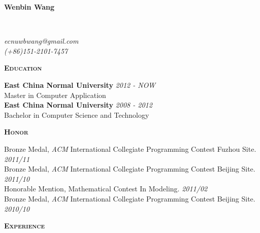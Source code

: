 \documentclass[a4paper]{article}
\newenvironment{changemargin}[2]{%
  \begin{list}{}{%
    \setlength{\topsep}{0pt}%
    \setlength{\leftmargin}{#1}%
    \setlength{\rightmargin}{#2}%
    \setlength{\listparindent}{\parindent}%
    \setlength{\itemindent}{\parindent}%
    \setlength{\parsep}{\parskip}%
  }%
  \item[]}{\end{list}
}
\newcommand{\lineover}{
	\begin{changemargin}{-0.05in}{-0.05in}
		\vspace*{-8pt}
		\hrulefill \\
		\vspace*{-2pt}
	\end{changemargin}
}
\newcommand{\header}[1]{
	\begin{changemargin}{-0.5in}{-0.5in}
		\scshape{\textbf{#1}}\\
	\end{changemargin}
}
\newcommand{\contact}[3]{
	\begin{changemargin}{-0.5in}{-0.5in}
		{\Large \textbf{#1}}\\ \smallskip
		\lineover
		\begin{flushright}
			\emph{#2}\\ \smallskip
			\emph{#3}\smallskip
		\end{flushright}
	\end{changemargin}
}
\newenvironment{body} {
	\vspace*{-16pt}
	\begin{changemargin}{-0.25in}{-0.5in}
  }	
	{\end{changemargin}
}
\begin{document}
\contact{Wenbin Wang}{ecnuwbwang@gmail.com}{(+86)151-2101-7457}

\header{Education}

\begin{body}
	\vspace{14pt}
	\textbf{East China Normal University} \hfill \emph{2012 - NOW}\\
	 Master in Computer Application\\
	\textbf{East China Normal University} \hfill \emph{2008 - 2012}\\
	Bachelor in Computer Science and Technology\\
\end{body}

\medskip


\header{Honor}
\begin{body}
	\vspace{14pt}
	Bronze Medal, \emph{ACM} International Collegiate Programming Contest Fuzhou Site. \hfill \emph{2011/11}\\
	Bronze Medal, \emph{ACM} International Collegiate Programming Contest Beijing Site. \hfill \emph{2011/10}\\
	Honorable Mention, Mathematical Contest In Modeling. \hfill \emph{2011/02}\\
	Bronze Medal, \emph{ACM} International Collegiate Programming Contest Beijing Site. \hfill \emph{2010/10}\\
\end{body}

\medskip



\header{Experience}
\end{document}
